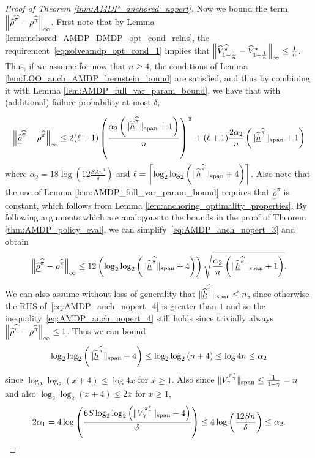 \documentclass{article}
\theoremstyle{plain}
\theoremstyle{plain}
\theoremstyle{remark}
\theoremstyle{plain}
\theoremstyle{plain}
\newcommand{\Vhat}{\widehat{V}}
\newcommand{\pistar}{\pi^\star}
\newcommand{\pihat}{\widehat{\pi}}
\newcommand{\Vhatstar}{\widehat{V}^\star}
\newcommand{\rhohat}{\widehat{\rho}}
\newcommand{\hhat}{\widehat{h}}
\newcommand{\rhohatanc}{ \underline{\rhohat}}
\newcommand{\hhatanc}{\underline{\hhat}}
\begin{document}
\begin{proof}[Proof of Theorem \ref{thm:AMDP_anchored_nopert}]
    Now we bound the term $\infnorm{ \rhohatanc^{\pihat} - \rho^{\pihat}}$. First note that by Lemma \ref{lem:anchored_AMDP_DMDP_opt_cond_relns}, the requirement~\eqref{eq:solveamdp_opt_cond_1} implies that $\infnorm{\Vhat_{1-\frac{1}{n}}^{\pihat} - \Vhatstar_{1-\frac{1}{n}}} \leq \frac{1}{n}$. Thus, if we assume for now that $n \geq 4$, the conditions of Lemma \ref{lem:LOO_anch_AMDP_bernstein_bound} are satisfied, and thus by combining it with Lemma \ref{lem:AMDP_full_var_param_bound}, we have that with (additional) failure probability at most $\delta$,
    \begin{align}
        \infnorm{\rhohatanc^{\pihat} - \rho^{\pihat}} \leq 2 (\ell + 1) \left(\frac{\alpha_2 \left(\spannorm{\hhatanc^{\pihat}} + 1\right)}{n} \right)^{ \frac{1}{2}}+ (\ell+1) \frac{2\alpha_2   }{n}\left(\spannorm{\hhatanc^{\pihat}} + 1 \right) \label{eq:AMDP_anch_nopert_3}
    \end{align}
    where $\alpha_2 = 18 \log \left(12 \frac{SAn^3}{\delta} \right)$ and $\ell = \left\lceil\log_2 \log_2 \left( \spannorm{\hhatanc^{\pihat}} + 4\right) \right\rceil$. Also note that the use of Lemma \ref{lem:AMDP_full_var_param_bound} requires that $\rhohatanc^{\pihat}$ is constant, which follows from Lemma \ref{lem:anchoring_optimality_properties}. By following arguments which are analogous to the bounds in the proof of Theorem \ref{thm:AMDP_policy_eval}, we can simplify~\eqref{eq:AMDP_anch_nopert_3} and obtain
    \begin{align}
        \infnorm{\rhohatanc^{\pihat} - \rho^{\pihat}} \leq 12 \left(\log_2 \log_2 \left( \spannorm{\hhatanc^{\pihat}} + 4\right)\right)   \sqrt{\frac{\alpha_2}{n}\left(\spannorm{\hhatanc^{\pihat}} + 1\right)}. \label{eq:AMDP_anch_nopert_4}
    \end{align}
    We can also assume without loss of generality that $\spannorm{\hhatanc^{\pihat}} \leq n$, since otherwise the RHS of~\eqref{eq:AMDP_anch_nopert_4} is greater than $1$ and so the inequality~\eqref{eq:AMDP_anch_nopert_4} still holds since trivially always $\infnorm{\rhohatanc^{\pihat} - \rho^{\pihat}} \leq 1$. Thus we can bound
    \[
        \log_2 \log_2 \left( \spannorm{\hhatanc^{\pihat}} + 4\right) \leq \log_2 \log_2 \left( n + 4\right) \leq \log 4 n \leq \alpha_2
    \]
    since $\log_2 \log_2 (x+4) \leq \log 4x$ for $x \geq 1$. Also since $\spannorm{V_\gamma^{\pistar_\gamma}} \leq \frac{1}{1-\gamma} = n$ and also $\log_2 \log_2 (x+4) \leq 2x$ for $x \geq 1$,
    \[
        2\alpha_1 = 4 \log \left( \frac{6 S \log_2 \log_2 \left(\spannorm{V_\gamma^{\pistar_\gamma}}+4 \right)}{\delta} \right) \leq 4 \log \left( \frac{12 S n }{\delta} \right) \leq \alpha_2.
\]
\end{proof}
\end{document}
